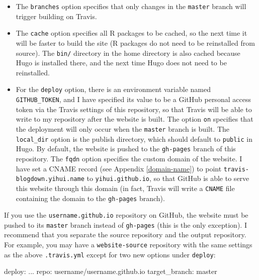 \documentclass[12pt,]{krantz}
\makeatletter
\newenvironment{Shaded}{\begin{snugshade}}{\end{snugshade}}
\newcommand{\AttributeTok}[1]{\textcolor[rgb]{0.77,0.63,0.00}{#1}}
\newcommand{\FunctionTok}[1]{\textcolor[rgb]{0.00,0.00,0.00}{#1}}
\newcommand{\NormalTok}[1]{#1}
\newenvironment{kframe}{%
\medskip{}
\setlength{\fboxsep}{.8em}
 \def\at@end@of@kframe{}%
 \ifinner\ifhmode%
  \def\at@end@of@kframe{\end{minipage}}%
  \begin{minipage}{\columnwidth}%
 \fi\fi%
 \def\FrameCommand##1{\hskip\@totalleftmargin \hskip-\fboxsep
 \colorbox{shadecolor}{##1}\hskip-\fboxsep
     \hskip-\linewidth \hskip-\@totalleftmargin \hskip\columnwidth}%
 \MakeFramed {\advance\hsize-\width
   \@totalleftmargin\z@ \linewidth\hsize
   \@setminipage}}%
 {\par\unskip\endMakeFramed%
 \at@end@of@kframe}
\renewenvironment{Shaded}{\begin{kframe}}{\end{kframe}}
\theoremstyle{definition}
\theoremstyle{definition}
\theoremstyle{definition}
\theoremstyle{remark}
\makeatother
\begin{document}
\begin{itemize}
\item
  The \texttt{branches} option specifies that only changes in the
  \texttt{master} branch will trigger building on Travis.
\item
  The \texttt{cache} option specifies all R packages to be cached, so
  the next time it will be faster to build the site (R packages do not
  need to be reinstalled from source). The \texttt{bin/} directory in
  the home directory is also cached because Hugo is installed there, and
  the next time Hugo does not need to be reinstalled.
\item
  For the \texttt{deploy} option, there is an environment variable named
  \texttt{GITHUB\_TOKEN}, and I have specified its value to be a GitHub
  personal access token via the Travis settings of this repository, so
  that Travis will be able to write to my repository after the website
  is built. The option \texttt{on} specifies that the deployment will
  only occur when the \texttt{master} branch is built. The
  \texttt{local\_dir} option is the publish directory, which should
  default to \texttt{public} in Hugo. By default, the website is pushed
  to the \texttt{gh-pages} branch of this repository. The \texttt{fqdn}
  option specifies the custom domain of the website. I have set a CNAME
  record (see Appendix \ref{domain-name}) to point
  \texttt{travis-blogdown.yihui.name} to \texttt{yihui.github.io}, so
  that GitHub is able to serve this website through this domain (in
  fact, Travis will write a \texttt{CNAME} file containing the domain to
  the \texttt{gh-pages} branch).
\end{itemize}

If you use the \texttt{username.github.io} repository on GitHub, the
website must be pushed to its \texttt{master} branch instead of
\texttt{gh-pages} (this is the only exception). I recommend that you
separate the source repository and the output repository. For example,
you may have a \texttt{website-source} repository with the same settings
as the above \texttt{.travis.yml} except for two new options under
\texttt{deploy}:

\begin{Shaded}
\begin{Highlighting}[]
\FunctionTok{deploy:}
\NormalTok{  ...}
  \FunctionTok{repo:}\AttributeTok{ username/username.github.io}
  \FunctionTok{target_branch:}\AttributeTok{ master}
\end{Highlighting}
\end{Shaded}
\end{document}
